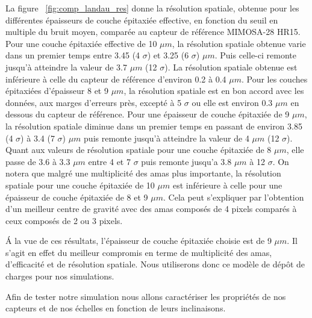    La figure ~\ref{fig:comp_landau_res} donne la r\'esolution spatiale, obtenue pour les diff\'erentes \'epaisseurs de couche épitaxiée effective, en fonction du seuil en multiple du bruit moyen, compar\'ee au capteur de r\'ef\'erence MIMOSA-28 HR15. Pour une couche épitaxiée effective de 10 $\mu m$, la résolution spatiale obtenue varie dans un premier temps entre 3.45 (4 $\sigma$) et 3.25 (6 $\sigma$) $\mu m$. Puis celle-ci remonte jusqu'\`a atteindre la valeur de 3.7 $\mu m$ (12 $\sigma$). La r\'esolution spatiale obtenue est inf\'erieure \`a celle du capteur de r\'ef\'erence d'environ 0.2 \`a 0.4 $\mu m$. Pour les couches épitaxiées d'\'epaisseur 8 et 9 $\mu m$, la r\'esolution spatiale est en bon accord avec les donn\'ees, aux marges d'erreurs pr\`es, except\'e \`a 5 $\sigma$ ou elle est environ 0.3 $\mu m$ en dessous du capteur de r\'ef\'erence. Pour une \'epaisseur de couche épitaxiée de 9 $\mu m$, la r\'esolution spatiale diminue dans un premier temps en passant de environ 3.85 (4 $\sigma$) \`a 3.4 (7 $\sigma$) $\mu m$ puis remonte jusqu'\`a atteindre la valeur de 4 $\mu m$ (12 $\sigma$). Quant aux valeurs de r\'esolution spatiale pour une couche épitaxiée de 8 $\mu m$, elle passe de 3.6 \`a 3.3 $\mu m$ entre 4 et 7 $\sigma$  puis remonte jusqu'a 3.8 $\mu m$ \`a 12 $\sigma$. On notera que malgr\'e une multiplicit\'e des amas plus importante, la r\'esolution spatiale pour une couche épitaxiée de 10 $\mu m$ est inf\'erieure \`a celle pour une \'epaisseur de couche épitaxiée de 8 et 9 $\mu m$. Cela peut s'expliquer par l'obtention d'un meilleur centre de gravit\'e avec des amas compos\'es de 4 pixels compar\'es \`a ceux compos\'es de 2 ou 3 pixels.
   
   \medskip

   \'A la vue de ces r\'esultats, l'\'epaisseur de couche épitaxiée choisie est de 9 $\mu m$. Il s'agit en effet du meilleur compromis en terme de multiplicit\'e des amas, d'efficacit\'e et de r\'esolution spatiale. Nous utiliserons donc ce mod\`ele de d\'epôt de charges pour nos simulations.
   
   
   \medskip
   
   Afin de tester notre simulation nous allons caract\'eriser les propri\'et\'es de nos capteurs et de nos \'echelles en fonction de leurs inclinaisons.
   
